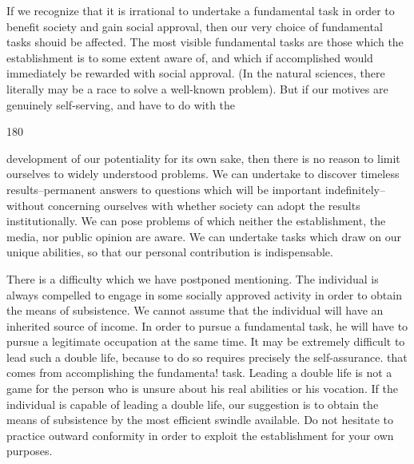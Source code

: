 \documentclass[10pt,twoside]{memoir}
\begin{document}
\begin{enumerate}
{\begin{enumerate}
\begin{sysrules}
\begin{sysrules}
\begin{sysrules}
\begin{sysrules}
{\begin{enumerate}
{{{{{{{If we recognize that it is irrational to undertake a fundamental task in 
order to benefit society and gain social approval, then our very choice of 
fundamental tasks shouid be affected. The most visible fundamental tasks 
are those which the establishment is to some extent aware of, and which if 
accomplished would immediately be rewarded with social approval. (In the 
natural sciences, there literally may be a race to solve a well-known problem). 
But if our motives are genuinely self-serving, and have to do with the 


180 


development of our potentiality for its own sake, then there is no reason to 
limit ourselves to widely understood problems. We can undertake to discover 
timeless results--permanent answers to questions which will be important 
indefinitely--without concerning ourselves with whether society can adopt 
the results institutionally. We can pose problems of which neither the 
establishment, the media, nor public opinion are aware. We can undertake 
tasks which draw on our unique abilities, so that our personal contribution is 
indispensable. 

There is a difficulty which we have postponed mentioning. The 
individual is always compelled to engage in some socially approved activity 
in order to obtain the means of subsistence. We cannot assume that the 
individual will have an inherited source of income. In order to pursue a 
fundamental task, he will have to pursue a legitimate occupation at the same 
time. It may be extremely difficult to lead such a double life, because to do 
so requires precisely the self-assurance. that comes from accomplishing the 
fundamenta! task. Leading a double life is not a game for the person who is 
unsure about his real abilities or his vocation. If the individual is capable of 
leading a double life, our suggestion is to obtain the means of subsistence by 
the most efficient swindle available. Do not hesitate to practice outward 
conformity in order to exploit the establishment for your own purposes. 

}}}}}}}
\end{enumerate}}
\end{sysrules}
\end{sysrules}
\end{sysrules}
\end{sysrules}
\end{enumerate}}
\end{enumerate}
\end{document}
